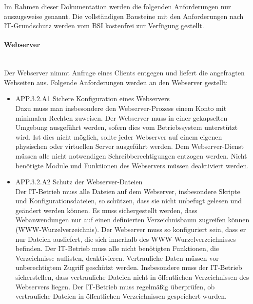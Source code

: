 Im Rahmen dieser Dokumentation werden die folgenden Anforderungen nur auszugsweise genannt. Die vollst\"andigen Bausteine mit den Anforderungen nach IT-Grundschutz werden vom \ac{BSI} kostenfrei zur Verf\"ugung gestellt.

\paragraph{Webserver}
\noindent \\Der Webserver nimmt Anfrage eines Clients entgegen und liefert die angefragten Webseiten aus. Folgende Anforderungen werden an den Webserver gestellt:
  \begin{itemize}
      \item APP.3.2.A1 Sichere Konfiguration eines Webservers\\
			Dazu muss man insbesondere den Webserver-Prozess einem Konto mit minimalen Rechten zuweisen. Der Webserver muss in einer gekapselten Umgebung ausgef\"uhrt werden, sofern dies vom Betriebssystem unterst\"utzt wird. Ist dies nicht m\"oglich, sollte jeder Webserver auf einem eigenen physischen oder virtuellen Server ausgef\"uhrt werden. Dem Webserver-Dienst m\"ussen alle nicht notwendigen Schreibberechtigungen entzogen werden. Nicht ben\"otigte Module und Funktionen des Webservers m\"ussen deaktiviert werden.\cite{Grundschutz}\\
			
			\item APP.3.2.A2 Schutz der Webserver-Dateien\\
			Der IT-Betrieb muss alle Dateien auf dem Webserver, insbesondere Skripte und Konfigurationsdateien, so sch\"utzen, dass sie nicht unbefugt gelesen und ge\"andert werden k\"onnen. Es muss sichergestellt werden, dass Webanwendungen nur auf einen definierten Verzeichnisbaum zugreifen k\"onnen (WWW-Wurzelverzeichnis). Der Webserver muss so konfiguriert sein, dass er nur Dateien ausliefert, die sich innerhalb des WWW-Wurzelverzeichnisses befinden. Der IT-Betrieb muss alle nicht ben\"otigten Funktionen, die Verzeichnisse auflisten, deaktivieren. Vertrauliche Daten m\"ussen vor unberechtigtem Zugriff gesch\"utzt werden. Insbesondere muss der
IT-Betrieb sicherstellen, dass vertrauliche Dateien nicht in \"offentlichen Verzeichnissen des Webservers liegen. Der IT-Betrieb muss regelm\"a{\ss}ig \"uberpr\"ufen, ob vertrauliche Dateien in \"offentlichen Verzeichnissen gespeichert wurden.\cite{Grundschutz}\\


\end{itemize}
